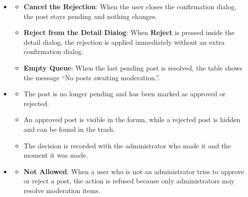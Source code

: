 \begin{itemize}[leftmargin=1.6em,topsep=4pt,itemsep=3pt,parsep=0pt,label=$\bullet$]
\begin{itemize}[leftmargin=2.2em,topsep=2pt,itemsep=3pt,parsep=0pt,label=$\circ$]
                \begin{itemize}[leftmargin=2.2em,topsep=2pt,itemsep=3pt,parsep=0pt,label=$\blacksquare$]
                    \item The post is never shown to ordinary users while it stays rejected.
                    \item The screen shows the message ``Post rejected and moved to trash''.
                \end{itemize}
            \item \textbf{Update the Queue}: The resolved post disappears from the list and the remaining items move up, so the queue always shows only the posts that still need a decision.
        \end{itemize}
    \item {}
        \begin{itemize}[leftmargin=2.2em,topsep=2pt,itemsep=3pt,parsep=0pt,label=$\circ$]
            \item \textbf{Cancel the Rejection}: When the user closes the confirmation dialog, the post stays pending and nothing changes.
            \item \textbf{Reject from the Detail Dialog}: When \textbf{Reject} is pressed inside the detail dialog, the rejection is applied immediately without an extra confirmation dialog.
            \item \textbf{Empty Queue}: When the last pending post is resolved, the table shows the message ``No posts awaiting moderation.''.
        \end{itemize}
    \item {}
        \begin{itemize}[leftmargin=2.2em,topsep=2pt,itemsep=3pt,parsep=0pt,label=$\circ$]
            \item The post is no longer pending and has been marked as approved or rejected.
            \item An approved post is visible in the forum, while a rejected post is hidden and can be found in the trash.
            \item The decision is recorded with the administrator who made it and the moment it was made.
        \end{itemize}
    \item {}
        \begin{itemize}[leftmargin=2.2em,topsep=2pt,itemsep=3pt,parsep=0pt,label=$\circ$]
            \item \textbf{Not Allowed}: When a user who is not an administrator tries to approve or reject a post, the action is refused because only administrators may resolve moderation items.

\end{itemize}
\end{itemize}
